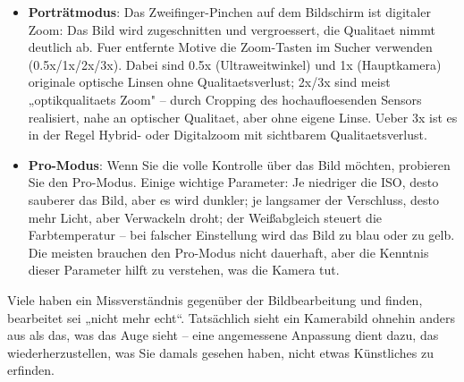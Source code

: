 \begin{itemize}
  \item \textbf{Porträtmodus}: Das Zweifinger-Pinchen auf dem Bildschirm ist digitaler Zoom: Das Bild wird zugeschnitten und vergroessert, die Qualitaet nimmt deutlich ab. Fuer entfernte Motive die Zoom-Tasten im Sucher verwenden (0.5x/1x/2x/3x). Dabei sind 0.5x (Ultraweitwinkel) und 1x (Hauptkamera) originale optische Linsen ohne Qualitaetsverlust; 2x/3x sind meist „optikqualitaets Zoom" – durch Cropping des hochaufloesenden Sensors realisiert, nahe an optischer Qualitaet, aber ohne eigene Linse. Ueber 3x ist es in der Regel Hybrid- oder Digitalzoom mit sichtbarem Qualitaetsverlust.
  \item \textbf{Pro-Modus}: Wenn Sie die volle Kontrolle über das Bild möchten, probieren Sie den Pro-Modus. Einige wichtige Parameter: Je niedriger die ISO, desto sauberer das Bild, aber es wird dunkler; je langsamer der Verschluss, desto mehr Licht, aber Verwackeln droht; der Weißabgleich steuert die Farbtemperatur – bei falscher Einstellung wird das Bild zu blau oder zu gelb. Die meisten brauchen den Pro-Modus nicht dauerhaft, aber die Kenntnis dieser Parameter hilft zu verstehen, was die Kamera tut.
\end{itemize}


Viele haben ein Missverständnis gegenüber der Bildbearbeitung und finden, bearbeitet sei „nicht mehr echt“. Tatsächlich sieht ein Kamerabild ohnehin anders aus als das, was das Auge sieht – eine angemessene Anpassung dient dazu, das wiederherzustellen, was Sie damals gesehen haben, nicht etwas Künstliches zu erfinden.

